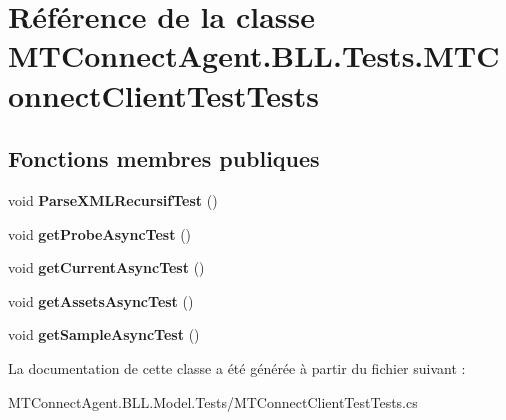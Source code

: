 \hypertarget{class_m_t_connect_agent_1_1_b_l_l_1_1_tests_1_1_m_t_connect_client_test_tests}{}\section{Référence de la classe M\+T\+Connect\+Agent.\+B\+L\+L.\+Tests.\+M\+T\+Connect\+Client\+Test\+Tests}
\label{class_m_t_connect_agent_1_1_b_l_l_1_1_tests_1_1_m_t_connect_client_test_tests}
\subsection*{Fonctions membres publiques}
\begin{DoxyCompactItemize}
\item 
\mbox{\label{class_m_t_connect_agent_1_1_b_l_l_1_1_tests_1_1_m_t_connect_client_test_tests_a91266681f0ac346817b804f3cf02f538}} 
void {\bfseries Parse\+X\+M\+L\+Recursif\+Test} ()
\item 
\mbox{\label{class_m_t_connect_agent_1_1_b_l_l_1_1_tests_1_1_m_t_connect_client_test_tests_a86a02e0d46428468dba6b77d85e65d19}} 
void {\bfseries get\+Probe\+Async\+Test} ()
\item 
\mbox{\label{class_m_t_connect_agent_1_1_b_l_l_1_1_tests_1_1_m_t_connect_client_test_tests_a7d01ffc1700c8c123617b37725cd9b22}} 
void {\bfseries get\+Current\+Async\+Test} ()
\item 
\mbox{\label{class_m_t_connect_agent_1_1_b_l_l_1_1_tests_1_1_m_t_connect_client_test_tests_a6d09e49e8d0883a79843b849f7adc3c9}} 
void {\bfseries get\+Assets\+Async\+Test} ()
\item 
\mbox{\label{class_m_t_connect_agent_1_1_b_l_l_1_1_tests_1_1_m_t_connect_client_test_tests_a07b77008a2acf90d32cc2b96e78a5aae}} 
void {\bfseries get\+Sample\+Async\+Test} ()
\end{DoxyCompactItemize}


La documentation de cette classe a été générée à partir du fichier suivant \+:\begin{DoxyCompactItemize}
\item 
M\+T\+Connect\+Agent.\+B\+L\+L.\+Model.\+Tests/M\+T\+Connect\+Client\+Test\+Tests.\+cs\end{DoxyCompactItemize}
